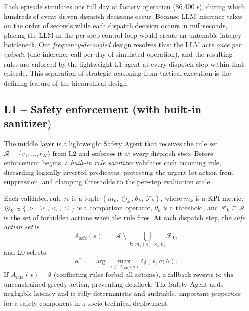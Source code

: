 \documentclass[10pt]{article}
\begin{document}
Each episode simulates one full day of factory operation (86,400 s), during which
hundreds of event-driven dispatch decisions occur. Because LLM inference takes on
the order of seconds while each dispatch decision occurs in milliseconds, placing
the LLM in the per-step control loop would create an untenable latency bottleneck.
Our \emph{frequency-decoupled} design resolves this: the LLM acts \emph{once per
episode} (one inference call per day of simulated operation), and the resulting
rules are enforced by the lightweight L1 agent at every dispatch step within that
episode. This separation of strategic reasoning from tactical execution is the
defining feature of the hierarchical design.

\subsection{L1 -- Safety enforcement (with built-in sanitizer)}
The middle layer is a lightweight Safety Agent that receives the rule set
$\mathcal{R} = \{r_1, \ldots, r_K\}$ from L2 and enforces it at every dispatch
step. Before enforcement begins, a \emph{built-in rule sanitizer} validates each
incoming rule, discarding logically inverted predicates, protecting the urgent-lot action from
suppression, and clamping thresholds to the per-step evaluation scale.

Each validated rule $r_k$ is a tuple
$(m_k,\, \odot_k,\, \theta_k,\, \mathcal{F}_k)$, where $m_k$ is a KPI metric,
$\odot_k \in \{>, \geq, <, \leq\}$ is a comparison operator, $\theta_k$ is a
threshold, and $\mathcal{F}_k \subseteq \mathcal{A}$ is the set of forbidden
actions when the rule fires.  At each dispatch step, the \emph{safe action set} is
\begin{equation}
  A_{\text{safe}}(s) \;=\; \mathcal{A} \;\setminus\;
  \bigcup_{k:\; m_k(s)\,\odot_k\,\theta_k} \mathcal{F}_k,
  \label{eq:mask}
\end{equation}
and L0 selects
\begin{equation}
  a^* \;=\; \arg\max_{a \,\in\, A_{\text{safe}}(s)} Q(s, a;\,\theta).
  \label{eq:constrained}
\end{equation}
If $A_{\text{safe}}(s) = \emptyset$ (conflicting rules forbid all actions),
a fallback reverts to the unconstrained greedy action, preventing deadlock.
The Safety Agent adds negligible latency and is fully deterministic and
auditable, important properties for a safety component in a socio-technical
deployment.
\end{document}
